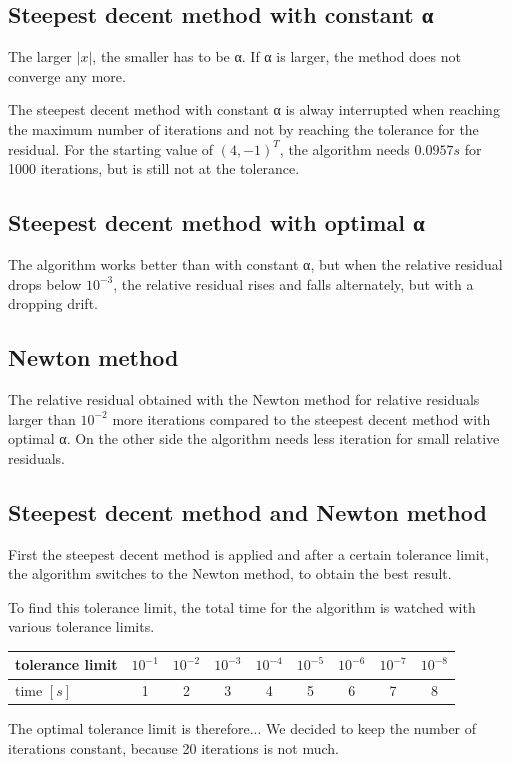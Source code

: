 \documentclass[a4paper,12pt]{article}
\begin{document}
\subsection{Steepest decent method with constant α}
The larger $|x|$, the smaller has to be α. %
If α is larger, the method does not converge any more.

The steepest decent method with constant α is alway interrupted when reaching the maximum number of iterations and not by reaching the tolerance for the residual.
For the starting value of $(4,-1)^T$, the algorithm needs $0.0957s$ for 1000 iterations, but is still not at the tolerance.


\subsection{Steepest decent method with optimal α}
The algorithm works better than with constant α, but when the relative residual drops below $10^{-3}$, the relative residual rises and falls alternately, but with a dropping drift.

\subsection{Newton method}
The relative residual obtained with the Newton method for relative residuals larger than $10^{-2}$ more iterations compared to the steepest decent method with optimal α.
On the other side the algorithm needs less iteration for small relative residuals.

\subsection{Steepest decent method and Newton method}
First the steepest decent method is applied and after a certain tolerance limit, the algorithm switches to the Newton method, to obtain the best result.

To find this tolerance limit, the total time for the algorithm is watched with various tolerance limits.

\begin{tabular}{l|c|c|c|c|c|c|c|c}
tolerance limit & $10^{-1}$& $10^{-2}$& $10^{-3}$& $10^{-4}$& $10^{-5}$& $10^{-6}$& $10^{-7}$& $10^{-8}$\\\hline
time $[s]$		& 1&2&3&4&5&6&7&8
\end{tabular}

The optimal tolerance limit is therefore...
We decided to keep the number of iterations constant, because 20 iterations is not much. 
\end{document}
